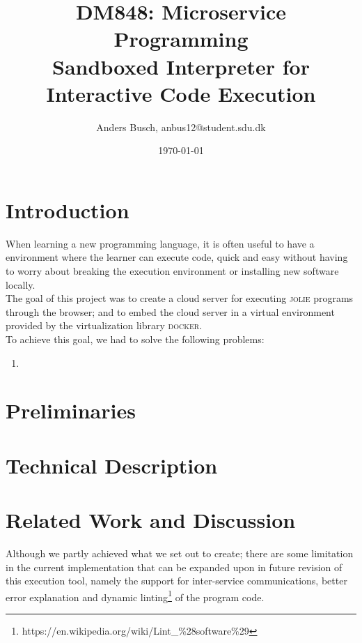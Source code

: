 \documentclass[12pt]{article}
\title{ \textbf{DM848}: Microservice Programming \\ {\Large Sandboxed Interpreter for Interactive Code Execution} }
\author{Anders Busch, anbus12@student.sdu.dk}
\date{\today \\ \hrulefill{}}
\newcommand{\docker}[0] {\textsc{docker}}
\newcommand{\jolie}[0] {\textsc{jolie}}
\begin{document}
\maketitle

\section{Introduction}

When learning a new programming language, it is often useful to have a environment where the learner can execute code, quick and easy without having to worry about breaking the execution environment or installing new software locally. \\

\noindent{}The goal of this project was to create a cloud server for executing \jolie{} programs through the browser; and to embed the cloud server in a virtual environment provided by the virtualization library \docker{}.\\

\noindent{}To achieve this goal, we had to solve the following problems:
\begin{enumerate}
\item 
\end{enumerate}

\section{Preliminaries}

\section{Technical Description}

\section{Related Work and Discussion}

Although we partly achieved what we set out to create; there are some limitation in the current implementation that can be expanded upon in future revision of this execution tool, namely the support for inter-service communications, better error explanation and dynamic linting\footnote{https://en.wikipedia.org/wiki/Lint\_\%28software\%29} of the program code.
\end{document}
